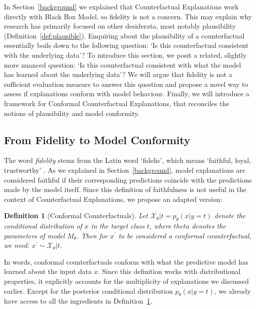 \documentclass{article}
\newtheorem{definition}{Definition}[section]
\begin{document}
In Section~\ref{background} we explained that Counterfactual Explanations work directly with Black Box Model, so fidelity is not a concern. This may explain why research has primarily focused on other desiderata, most notably plausibility (Definition~\ref{def:plausible}). Enquiring about the plausibility of a counterfactual essentially boils down to the following question: `Is this counterfactual consistent with the underlying data'? To introduce this section, we posit a related, slightly more nuanced question: `Is this counterfactual consistent with what the model has learned about the underlying data'? We will argue that fidelity is not a sufficient evaluation measure to answer this question and propose a novel way to assess if explanations conform with model behaviour. Finally, we will introduce a framework for Conformal Counterfactual Explanations, that reconciles the notions of plausibility and model conformity. 

\subsection{From Fidelity to Model Conformity}

The word \textit{fidelity} stems from the Latin word `fidelis', which means `faithful, loyal, trustworthy' \citep{mw2023fidelity}. As we explained in Section~\ref{background}, model explanations are considered faithful if their corresponding predictions coincide with the predictions made by the model itself. Since this definition of faithfulness is not useful in the context of Counterfactual Explanations, we propose an adapted version: 

\begin{definition}[Conformal Counterfactuals]
  \label{def:conformal}
  Let $\mathcal{X}_{\theta}|t = p_{\theta}(x|y=t)$ denote the conditional distribution of $x$ in the target class $t$, where $theta$ denotes the parameters of model $M_{\theta}$. Then for $x^{\prime}$ to be considered a conformal counterfactual, we need: $x^{\prime} \sim \mathcal{X}_{\theta}|t$.
\end{definition}

In words, conformal counterfactuals conform with what the predictive model has learned about the input data $x$. Since this definition works with distributional properties, it explicitly accounts for the multiplicity of explanations we discussed earlier. Except for the posterior conditional distribution $p_{\theta}(x|y=t)$, we already have access to all the ingredients in Definition~\ref{def:conformal}.
\end{document}
